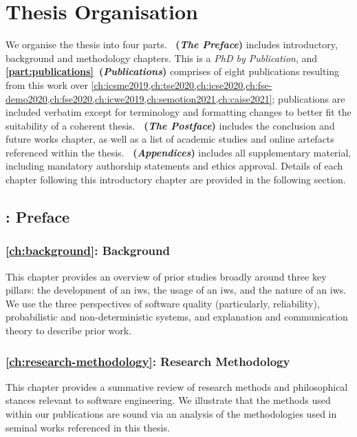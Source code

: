 \section{Thesis Organisation}
\label{sec:introduction:organisation}

We organise the thesis into four parts. \textbf{~(\textit{The Preface})} includes introductory, background and methodology chapters. This is a \textit{PhD by Publication}, and \textbf{\cref{part:publications}~(\textit{Publications})} comprises of eight publications resulting from this work over \cref{ch:icsme2019,ch:tse2020,ch:icse2020,ch:fse-demo2020,ch:fse2020,ch:icwe2019,ch:semotion2021,ch:caise2021}; publications are included verbatim except for terminology and formatting changes to better fit the suitability of a coherent thesis. \textbf{~(\textit{The Postface})} includes the conclusion and future works chapter, as well as a list of academic studies and online artefacts referenced within the thesis. \textbf{~(\textit{Appendices})} includes all supplementary material, including mandatory authorship statements and ethics approval. Details of each chapter following this introductory chapter are provided in the following section.

\subsection{: Preface}

\subsubsection{\cref{ch:background}: Background} This chapter provides an overview of prior studies broadly around three key pillars: the development of an \gls{iws}, the usage of an \gls{iws}, and the nature of an \gls{iws}. We use the three perspectives of software quality (particularly, reliability), probabilistic and non-deterministic systems, and explanation and communication theory to describe prior work.

\subsubsection{\cref{ch:research-methodology}: Research Methodology} This chapter provides a summative review of research methods and philosophical stances relevant to software engineering. We illustrate that the methods used within our publications are sound via an analysis of the methodologies used in seminal works referenced in this thesis.

